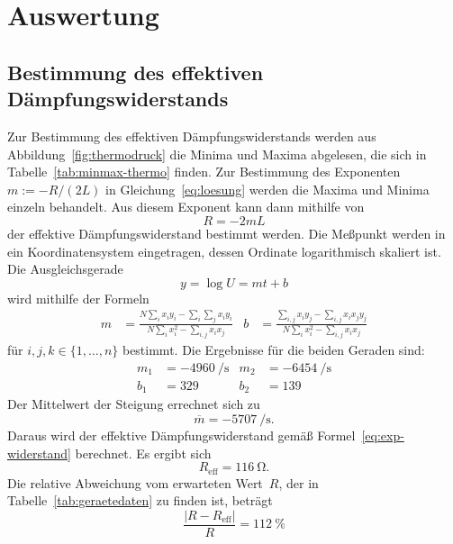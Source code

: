 
\section{Auswertung}

\subsection{Bestimmung des  effektiven Dämpfungswiderstands}
Zur Bestimmung des effektiven Dämpfungswiderstands werden aus
Abbildung~\ref{fig:thermodruck} die Minima und Maxima abgelesen, die
sich in Tabelle~\ref{tab:minmax-thermo} finden. Zur Bestimmung des
Exponenten $m := -R/(2L)$ in Gleichung~\eqref{eq:loesung} werden die
Maxima und Minima einzeln behandelt. Aus diesem Exponent kann dann
mithilfe von
\begin{equation}
  R = -2mL
  \label{eq:exp-widerstand}
\end{equation}
der effektive Dämpfungswiderstand bestimmt werden.
Die Meßpunkt werden in ein Koordinatensystem eingetragen, dessen
Ordinate logarithmisch skaliert ist. Die Ausgleichsgerade
%
\begin{equation}
	y = \log U = mt + b
\end{equation}
wird mithilfe der Formeln
\begin{align*}
  m &= \frac{N \sum_i x_i y_i - \sum_i\sum_j x_i y_i} {N \sum_i x_i^2 -
    \sum_{i, j} x_i x_j} & b &= \frac{ \sum_{i,j} x_i y_j - \sum_{i, j}
    x_i x_j y_j} {N \sum_i x_i^2 - \sum_{i, j} x_i x_j}
\end{align*}
für $i,j, k\in\{1,\dotsc,n\}$ bestimmt. Die Ergebnisse für die beiden
Geraden sind:
\begin{align*}
  m_1 &= \SI{-4960}{\per\second} & m_2 &= \SI{-6454}{\per\second}\\
  b_1 &= \num{329}& b_2 &= \num{139}
\end{align*}
%
Der Mittelwert der Steigung errechnet sich zu
%
\begin{equation*}
  \overline{m} = \SI{-5707}{\per\second}.
\end{equation*}
Daraus wird der effektive Dämpfungswiderstand gemäß
Formel~\eqref{eq:exp-widerstand} berechnet. Es ergibt sich
\begin{equation*}
  R_\text{eff} = \SI{116}{\ohm}.
\end{equation*}
Die relative Abweichung vom erwarteten Wert~$R$, der in
Tabelle~\ref{tab:geraetedaten} zu finden ist, beträgt
\begin{equation*}
  \frac{|R - R_\text{eff}|}{R} = \SI{112}{\percent}
\end{equation*}

